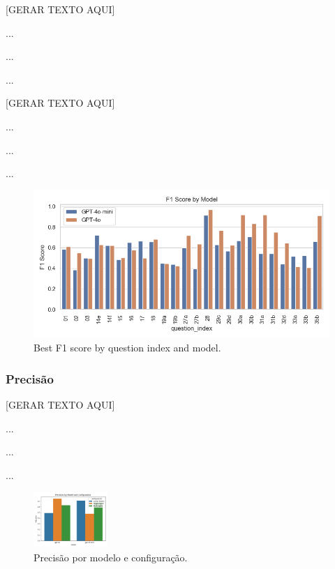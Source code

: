                 [GERAR TEXTO AQUI]

                ...

                ...

                ...
                

                [GERAR TEXTO AQUI]

                ...

                ...
                
                ...

                
                \begin{figure}
                    \centering
                    \includegraphics[width=1\linewidth]{images_exp2/best_f1_by_question_index_and_model.png}
                    \caption{Best F1 score by question index and model.}
                    \label{fig:best_f1_by_question_index_and_model}
                \end{figure}


            \subsubsection{Precisão}

                [GERAR TEXTO AQUI]

                ...

                ...

                ...

                \begin{figure}[h!]
                    \centering              
                    \includegraphics[width=0.25\textwidth]{images_part_2/model_precision_model_configuration.png}
                    \caption{Precisão por modelo e configuração.}
                    \label{fig:model_precision_model_configuration}
                \end{figure}
                
